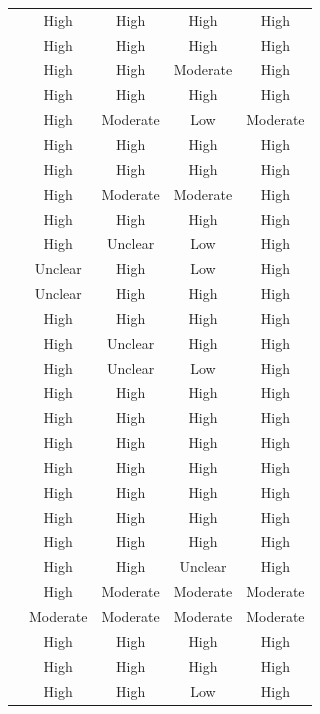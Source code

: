 \documentclass[a4paper,fleqn]{cas-sc}
\begin{document}
\begin{longtable}{|l|c|c|c|c|}
\citet{31DeAmicis2009451} & High & High & High & High \\
\citet{32Cheng20241718} & High & High & High & High \\
\citet{34Serrano2023} & High & High & Moderate & High \\
\citet{35Fernandez2023} & High & High & High & High \\
\citet{36Scholz2021} & High & Moderate & Low & Moderate \\
\citet{37Lewis202054} & High & High & High & High \\
\citet{38Mercik2024} & High & High & High & High \\
\citet{39Tegos2014838} & High & Moderate & Moderate & High \\
\citet{40Kuran2018} & High & High & High & High \\
\citet{41Petersen2023301} & High & Unclear & Low & High \\
\citet{42Huffer201581} & Unclear & High & Low & High \\
\citet{43ali2018indonesian} & Unclear & High & High & High \\
\citet{44Shiue2016} & High & High & High & High \\
\citet{45Yu2016727} & High & Unclear & High & High \\
\citet{46Stirling2022} & High & Unclear & Low & High \\
\citet{47Clara2010156} & High & High & High & High \\
\citet{48Moketar2021} & High & High & High & High \\
\citet{49Huizenga2007127} & High & High & High & High \\
\citet{50Lye2013} & High & High & High & High \\
\citet{51Ardito2007} & High & High & High & High \\
\citet{52Lin2011265} & High & High & High & High \\
\citet{53Perez2014} & High & High & High & High \\
\citet{54Gibson2007} & High & High & Unclear & High \\
\citet{55Squire2004} & High & Moderate & Moderate & Moderate \\
\citet{56Akkerman2009449} & Moderate & Moderate & Moderate & Moderate \\
\citet{58Shih2015173} & High & High & High & High \\
\citet{59Kee2014270} & High & High & High & High \\
\citet{60Hoy2018} & High & High & Low & High \\

\end{longtable}
\end{document}
